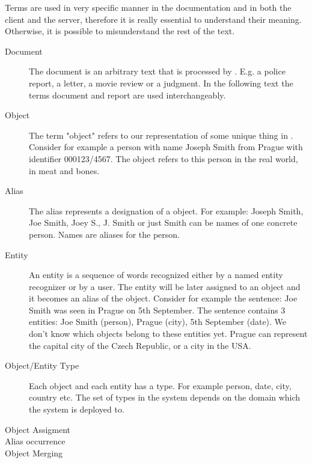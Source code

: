 Terms are used in very specific manner in the documentation and in both the
client and the server, therefore it is really essential to understand their
meaning. Otherwise, it is possible to misunderstand the rest of the text.

\begin{description}
\item[Document]
The document is an arbitrary text that is processed by \textan{}. E.g. a police
report, a letter, a movie review or a judgment. In the following text the terms
document and report are used interchangeably.

\item[Object]
The term "object" refers to our representation of some unique thing in
\textan{}. Consider for example a person with name Joseph Smith from Prague with
identifier 000123/4567. The object refers to this person in the real world, in
meat and bones.

\item[Alias]
The alias represents a designation of a object. For example: Joseph Smith, Joe
Smith, Joey S., J. Smith or just Smith can be names of one concrete person.
Names are aliases for the person.

\item[Entity]
An entity is a sequence of words recognized either by a named entity recognizer
or by a user. 
The entity will be later assigned to an object and it becomes an alias
of the object. Consider for example the sentence: Joe Smith was seen
in Prague on 5th September. The sentence contains 3 entities: Joe Smith (person),
Prague (city), 5th September (date). We don't know which objects belong to these
entities yet. Prague can represent the capital city of the Czech Republic,
or a city in the USA.

\item[Object/Entity Type]
Each object and each entity has a type. For example person, date, city, country
etc. The set of types in the system depends on the domain which the system is
deployed to.

\item[Object Assigment]

\item[Alias occurrence]

\item[Object Merging]


\end{description}
